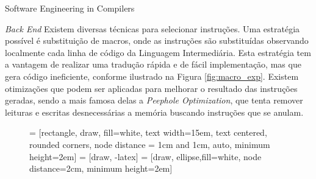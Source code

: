 \begin{section}{Software Engineering in Compilers}
\begin{subsection}{\textit{Back End}}
    Existem diversas técnicas para selecionar instruções. Uma estratégia possível
é substituição de macros, onde as instruções são substituídas
observando localmente cada linha de código da Linguagem Intermediária. Esta estratégia
tem a vantagem de realizar uma tradução rápida e de fácil implementação, mas que gera
código ineficiente, conforme ilustrado na Figura \ref{fig:macro_exp}. Existem otimizações
que podem ser aplicadas para melhorar o resultado das instruções geradas, sendo a mais famosa
delas a \textit{Peephole Optimization}, que tenta remover leituras e escritas desnecessárias
a memória buscando instruções que se anulam.

\begin{figure}
 = [rectangle, draw, fill=white,
    text width=15em, text centered, rounded corners, node distance = 1cm and 1cm, auto, minimum height=2em]
 = [draw, -latex]
 = [draw, ellipse,fill=white, node distance=2cm,
    minimum height=2em]

\begin{center}
\end{center}


\end{figure}
\end{subsection}
\end{section}
